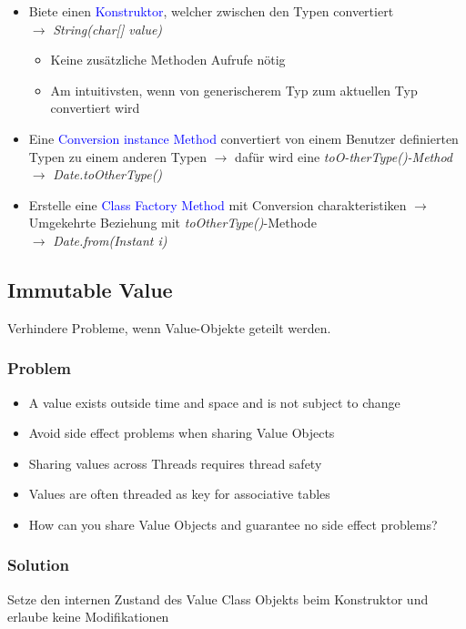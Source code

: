 \begin{itemize}
    \item Biete einen \textcolor{blue}{Konstruktor}, welcher zwischen den Typen convertiert \\
    $\rightarrow$ \textit{String(char[] value)}
    \begin{itemize}
        \item Keine zusätzliche Methoden Aufrufe nötig
        \item Am intuitivsten, wenn von generischerem Typ zum aktuellen Typ convertiert wird
    \end{itemize}
    \item Eine \textcolor{blue}{Conversion instance Method} convertiert von einem Benutzer definierten Typen zu einem anderen Typen $\rightarrow$ dafür wird eine \textit{toO-therType()-Method} \\
    $\rightarrow$ \textit{Date.toOtherType()}
    \item Erstelle eine \textcolor{blue}{Class Factory Method} mit Conversion charakteristiken $\rightarrow$ Umgekehrte Beziehung mit \textit{toOtherType()}-Methode \\
    $\rightarrow$ \textit{Date.from(Instant i)}
\end{itemize}

\subsection{Immutable Value}

Verhindere Probleme, wenn Value-Objekte geteilt werden.

\subsubsection{Problem}
\begin{itemize}
    \item A value exists outside time and space and is not subject to change
    \item Avoid side effect problems when sharing Value Objects
    \item Sharing values across Threads requires thread safety
    \item Values are often threaded as key for associative tables
    \item How can you share Value Objects and guarantee no side effect problems?
\end{itemize}
\subsubsection{Solution}
Setze den internen Zustand des Value Class Objekts beim Konstruktor und erlaube keine Modifikationen


